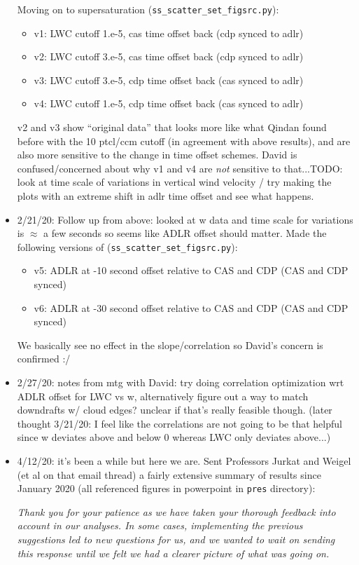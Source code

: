 \documentclass{article}
\begin{document}
\begin{itemize}
	Moving on to supersaturation (\texttt{ss\_scatter\_set\_figsrc.py}):
	\begin{itemize}
		\item v1: LWC cutoff 1.e-5, cas time offset back (cdp synced to adlr)
		\item v2: LWC cutoff 3.e-5, cas time offset back (cdp synced to adlr)
		\item v3: LWC cutoff 3.e-5, cdp time offset back (cas synced to adlr)
		\item v4: LWC cutoff 1.e-5, cdp time offset back (cas synced to adlr)
	\end{itemize}
	v2 and v3 show ``original data'' that looks more like what Qindan found before with the 10 ptcl/ccm cutoff (in agreement with above results), and are also more sensitive to the change in time offset schemes. David is confused/concerned about why v1 and v4 are \emph{not} sensitive to that...TODO: look at time scale of variations in vertical wind velocity / try making the plots with an extreme shift in adlr time offset and see what happens.
	\item 2/21/20: Follow up from above: looked at w data and time scale for variations is $\approx$ a few seconds so seems like ADLR offset should matter. Made the following versions of (\texttt{ss\_scatter\_set\_figsrc.py}):
	\begin{itemize}
		\item v5: ADLR at -10 second offset relative to CAS and CDP (CAS and CDP synced)
		\item v6: ADLR at -30 second offset relative to CAS and CDP (CAS and CDP synced)
	\end{itemize}
	We basically see no effect in the slope/correlation so David's concern is confirmed :/ 
	\item 2/27/20: notes from mtg with David: try doing correlation optimization wrt ADLR offset for LWC vs w, alternatively figure out a way to match downdrafts w/ cloud edges? unclear if that's really feasible though. (later thought 3/21/20: I feel like the correlations are not going to be that helpful since w deviates above and below 0 whereas LWC only deviates above...)
	\item 4/12/20: it's been a while but here we are. Sent Professors Jurkat and Weigel (et al on that email thread) a fairly extensive summary of results since January 2020 (all referenced figures in powerpoint in \texttt{pres} directory):\\

{\itshape Thank you for your patience as we have taken your thorough feedback into account in our analyses. In some cases, implementing the previous suggestions led to new questions for us, and we wanted to wait on sending this response until we felt we had a clearer picture of what was going on.

}
\end{itemize}
\end{document}
